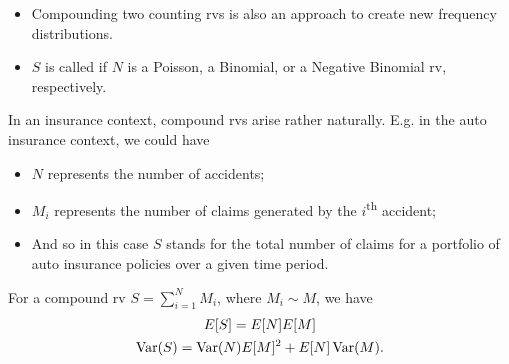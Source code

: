 \documentclass[notoc,notitlepage]{tufte-book}
\begin{document}
\begin{remark}
  \begin{itemize}
    \item Compounding two counting rvs is also an approach to create new frequency distributions.
    \item $S$ is called  if $N$ is a Poisson, a Binomial, or a Negative Binomial rv, respectively.
  \end{itemize}
\end{remark}

\begin{eg}[Interpretation]
  In an insurance context, compound rvs arise rather naturally. E.g. in the auto insurance context, we could have
  \begin{itemize}
    \item $N$ represents the number of accidents;
    \item $M_i$ represents the number of claims generated by the $i$\textsuperscript{th} accident;
    \item And so in this case $S$ stands for the total number of claims for a portfolio of auto insurance policies over a given time period.
  \end{itemize}
\end{eg}

\begin{propo}\label{propo:mean_and_variance_of_the_compound_rv}
  For a compound rv $S = \sum_{i=1}^{N} M_i$, where $M_i \sim M$, we have
  \begin{gather*}
    E [ S ] = E[N] E[M] \\
    \operatorname{Var}(S) = \operatorname{Var}(N)E[M]^2 + E[N]\operatorname{Var}(M).
  \end{gather*}
\end{propo}
\end{document}
